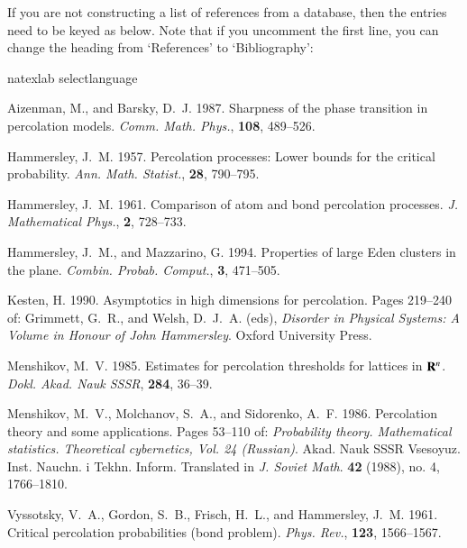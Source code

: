 If you are not constructing a list of references from a database,
then the entries need to be keyed as below. Note that if you uncomment
the first line, you can change the heading from `References' to `Bibliography':
%
\begin{smallverbatim}
  \begin{thebibliography}{8}
    \expandafter\ifx\csname natexlab\endcsname\relax
      \def\natexlab#1{#1}\fi
    \expandafter\ifx\csname selectlanguage\endcsname\relax
      \def\selectlanguage#1{\relax}\fi

    Aizenman, M., and Barsky, D.~J. 1987.
    Sharpness of the phase transition in percolation models.
    {\em Comm. Math. Phys.}, {\bf 108}, 489--526.

    Hammersley, J.~M. 1957.
    Percolation processes: Lower bounds for the critical probability.
    {\em Ann. Math. Statist.}, {\bf 28}, 790--795.

    Hammersley, J.~M. 1961.
    Comparison of atom and bond percolation processes.
    {\em J. Mathematical Phys.}, {\bf 2}, 728--733.

    Hammersley, J.~M., and Mazzarino, G. 1994.
    Properties of large Eden clusters in the plane.
    {\em Combin. Probab. Comput.}, {\bf 3}, 471--505.

    Kesten, H. 1990.
    Asymptotics in high dimensions for percolation.
    Pages  219--240 of: Grimmett, G.~R., and Welsh, D.~J.~A. (eds),
    {\em Disorder in Physical Systems: A Volume in Honour of John Hammersley}.
    Oxford University Press.

    Menshikov, M.~V. 1985.
    Estimates for percolation thresholds for lattices in {${\bf R}\sp n$}.
    {\em Dokl. Akad. Nauk SSSR}, {\bf 284}, 36--39.

    Menshikov, M.~V., Molchanov, S.~A., and Sidorenko, A.~F. 1986.
    Percolation theory and some applications.
    Pages  53--110 of: {\em Probability theory. Mathematical
    statistics. Theoretical cybernetics, Vol. 24 (Russian)}.
    Akad. Nauk SSSR Vsesoyuz. Inst. Nauchn. i Tekhn. Inform.
    Translated in {\em J. Soviet Math}. {\bf 42} (1988), no. 4,
    1766--1810.

    Vyssotsky, V.~A., Gordon, S.~B., Frisch, H.~L., and Hammersley, J.~M. 1961.
    Critical percolation probabilities (bond problem).
    {\em Phys. Rev.}, {\bf 123}, 1566--1567.

  \end{thebibliography}
\end{smallverbatim}

